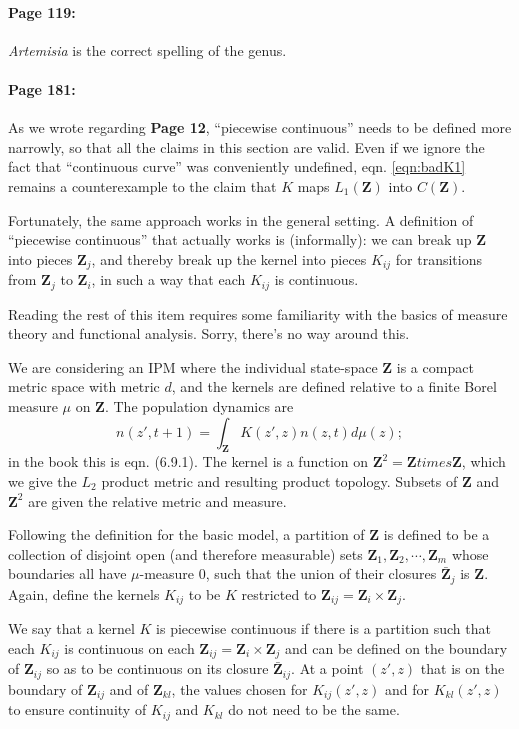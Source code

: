 \documentclass[12pt]{article}
\numberwithin{Box}{section}
\def\Z{\mathbf{Z}}
\newcommand{\be}{\begin{equation}}
\newcommand{\ee}{\end{equation}}
\begin{document}
\paragraph{Page 119:} \emph{Artemisia} is the correct spelling of the genus. 

\paragraph{Page 181:} As we wrote regarding \textbf{Page 12}, ``piecewise continuous'' needs 
to be defined more narrowly, so that all the claims in this section are valid. 
Even if we ignore the fact that ``continuous curve'' was conveniently undefined, 
eqn. \eqref{eqn:badK1} remains a counterexample to the claim that $K$ maps $L_1(\Z)$ into $C(\Z)$. 

Fortunately, the same approach works in the general setting. A definition of ``piecewise continuous''
that actually works is (informally): we can break up $\Z$ into pieces $\Z_j$, and thereby break up the kernel into
pieces $K_{ij}$ for transitions from $\Z_j$ to $\Z_i$, in such a way that each $K_{ij}$ is continuous. 

Reading the rest of this item requires some familiarity with the basics of measure theory 
and functional analysis. Sorry, there's no way around this. 

We are considering an IPM where the individual state-space $\Z$ is a compact metric space with metric $d$, 
and the kernels are defined relative to a finite Borel measure $\mu$ on $\Z$. 
The population dynamics are 
\be
n(z',t+1) = \int_{\Z} K(z',z)n(z,t) d\mu(z);
\ee 
in the book this is eqn. (6.9.1). The kernel is a function on $\Z^2 = \Z times \Z$, which we give the
$L_2$ product metric and resulting product topology. Subsets of $\Z$ and $\Z^2$ are given the relative
metric and measure. 

Following the definition for the basic model, a partition of $\Z$ is defined to be a collection of disjoint 
open (and therefore measurable) sets $\Z_1, \Z_2, \cdots, \Z_m $ whose boundaries all have $\mu$-measure 0, 
such that the union of their closures $\bar{\Z}_j$ is $\Z$. Again, define the kernels $K_{ij}$ to be $K$ 
restricted to $\Z_{ij} = \Z_i \times \Z_j$. 

We say that a kernel $K$ is piecewise continuous if there is a partition such that each $K_{ij}$ is 
continuous on each $\Z_{ij} = \Z_i \times \Z_j$ and can be defined on the boundary 
of $\Z_{ij}$ so as to be continuous on its closure $\bar{\Z}_{ij}$. At a point $(z',z)$ that is on the boundary
of $\Z_{ij}$ and of $\Z_{kl}$, the values chosen for $K_{ij}(z',z)$ and for $K_{kl}(z',z)$ to ensure continuity
of $K_{ij}$ and $K_{kl}$ do not need to be the same.  
\end{document}
